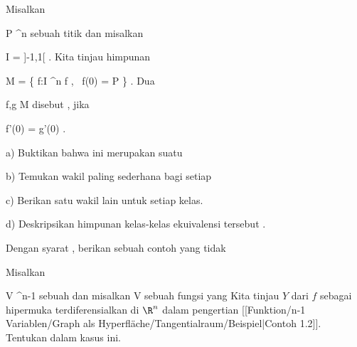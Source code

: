 {}
{

Misalkan

\mavergleichskette
{\vergleichskette
{ P
}
{ \in }{ \R^n
}
{  }{
}
{    }{
}
{   }{
}
}
{}{}{}
sebuah titik dan misalkan

\mavergleichskette
{\vergleichskette
{ I
}
{ = }{ {]{-1},1[}
}
{  }{
}
{    }{
}
{   }{
}
}
{}{}{.}
Kita tinjau himpunan

\mavergleichskettedisp
{\vergleichskette
{ M
}
{ =} { \left\{ f:I \rightarrow \R^n   \mid  f  , \,  f(0) = P       \right\}
}
{ } {
}
{ } {
}
{ } {
}
}
{}{}{.}
Dua

\mavergleichskette
{\vergleichskette
{ f,g
}
{ \in }{ M
}
{  }{
}
{    }{
}
{   }{
}
}
{}{}{}
disebut  {,} jika

\mavergleichskettedisp
{\vergleichskette
{ f'(0)
}
{ =} { g'(0)
}
{ } {
}
{ } {
}
{ } {
}
}
{}{}{.}

a) Buktikan bahwa ini merupakan suatu

b) Temukan wakil paling sederhana bagi setiap

c) Berikan satu wakil lain untuk setiap kelas.

d) Deskripsikan himpunan kelas-kelas ekuivalensi tersebut
 {} {.}

}
{} {}

{}
{

Dengan syarat
 {} {,}
berikan sebuah contoh
yang tidak

}
{} {}

{}
{

Misalkan

\mavergleichskette
{\vergleichskette
{ V
}
{ \subseteq }{ \R^{n-1}
}
{  }{
}
{    }{
}
{   }{
}
}
{}{}{}
sebuah
dan misalkan
 { V } {\R
} {}
sebuah fungsi yang
Kita tinjau
$Y$ dari $f$ sebagai hipermuka terdiferensialkan di $\R^n$ dalam pengertian
[[Funktion/n-1 Variablen/Graph als Hyperfläche/Tangentialraum/Beispiel|Contoh 1.2]].
Tentukan
dalam kasus ini.

}
{} {}

